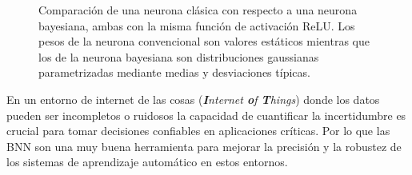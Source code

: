 \begin{figure}[htb]
  \begin{subcaptiongroup}
  \begin{floatrow}
  \end{floatrow}
  \end{subcaptiongroup}
  \caption{Comparación de una neurona clásica con respecto a una neurona bayesiana, ambas con la misma función de activación ReLU. Los pesos de la neurona convencional son valores estáticos mientras que los de la neurona bayesiana son distribuciones gaussianas parametrizadas mediante medias y desviaciones típicas.}%
  \label{fig:neuron_comparation}%
\end{figure}

En un entorno de internet de las cosas (\textit{\textbf{I}nternet \textbf{o}f \textbf{T}hings}) donde los datos pueden ser incompletos o ruidosos la capacidad de cuantificar la incertidumbre es crucial para tomar decisiones confiables en aplicaciones críticas. Por lo que las BNN son una muy buena herramienta para mejorar la precisión y la robustez de los sistemas de aprendizaje automático en estos entornos.

